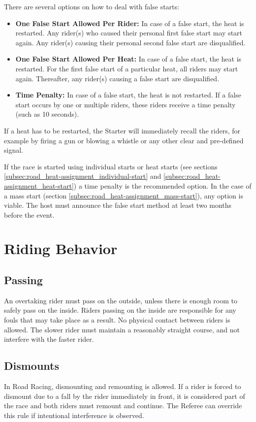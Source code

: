 There are several options on how to deal with false starts:
\begin{itemize}
\item \textbf{One False Start Allowed Per Rider:}
In case of a false start, the heat is restarted.
Any rider(s) who caused their personal first false start may start again.
Any rider(s) causing their personal second false start are disqualified.
\item \textbf{One False Start Allowed Per Heat:} 
In case of a false start, the heat is restarted.
For the first false start of a particular heat, all riders may start again.
Thereafter, any rider(s) causing a false start are disqualified.
\item \textbf{Time Penalty:}
In case of a false start, the heat is not restarted.
If a false start occurs by one or multiple riders, these riders receive a time penalty (such as 10 seconds).
\end{itemize}
If a heat has to be restarted, the Starter will immediately recall the riders, for example by firing a gun or blowing a whistle or any other clear and pre-defined signal.

If the race is started using individual starts or heat starts (see sections \ref{subsec:road_heat-assignment_individual-start} and \ref{subsec:road_heat-assignment_heat-start}) a time penalty is the recommended option.
In the case of a mass start (section \ref{subsec:road_heat-assignment_mass-start}), any option is viable.
The host must announce the false start method at least two months before the event.

\section{Riding Behavior}

\subsection{Passing}
An overtaking rider must pass on the outside, unless there is enough room to safely pass on the inside.
Riders passing on the inside are responsible for any fouls that may take place as a result.
No physical contact between riders is allowed.
The slower rider must maintain a reasonably straight course, and not interfere with the faster rider.

\subsection{Dismounts}
In Road Racing, dismounting and remounting is allowed. 
If a rider is forced to dismount due to a fall by the rider immediately in front, it is considered part of the race and both riders must remount and continue.
The Referee can override this rule if intentional interference is observed.

